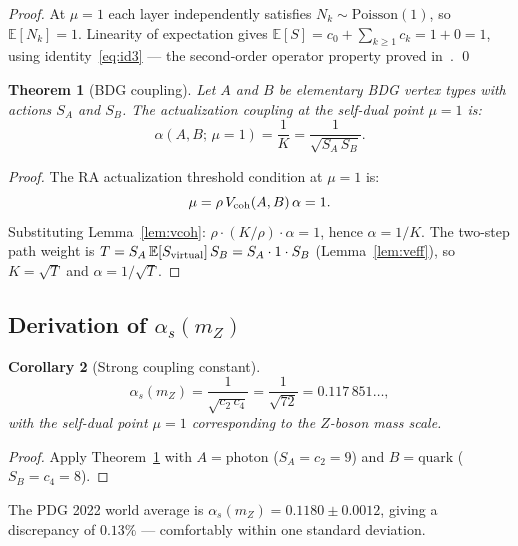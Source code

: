 \documentclass[12pt,a4paper]{article}
\newtheorem{theorem}{Theorem}
\newtheorem{corollary}[theorem]{Corollary}
\theoremstyle{definition}
\begin{document}
\begin{proof}
At $\mu=1$ each layer independently satisfies $N_k \sim \mathrm{Poisson}(1)$,
so $\mathbb{E}[N_k]=1$.  Linearity of expectation gives
$\mathbb{E}[S] = c_0 + \sum_{k\ge 1} c_k = 1 + 0 = 1$, using
identity~\eqref{eq:id3} — the second-order operator property proved
in~\cite{Glaser2014}. \qed
\end{proof}

\begin{theorem}[BDG coupling]
\label{thm:alpha}
Let $A$ and $B$ be elementary BDG vertex types with actions $S_A$ and
$S_B$.  The actualization coupling at the self-dual point $\mu=1$ is:
\begin{equation}
  \label{eq:alpha}
  \alpha(A,B;\,\mu=1) = \frac{1}{K} = \frac{1}{\sqrt{S_A\,S_B}}.
\end{equation}
\end{theorem}

\begin{proof}
The RA actualization threshold condition at $\mu=1$ is:
\[
  \mu = \rho\,V_{\rm coh}(A,B)\,\alpha = 1.
\]
Substituting Lemma~\ref{lem:vcoh}: $\rho\cdot(K/\rho)\cdot\alpha = 1$,
hence $\alpha = 1/K$.  The two-step path weight is
$T = S_A\,\mathbb{E}[S_{\rm virtual}]\,S_B = S_A\cdot 1\cdot S_B$
(Lemma~\ref{lem:veff}), so $K=\sqrt{T}$ and $\alpha = 1/\sqrt{T}$.
\end{proof}

\subsection{Derivation of $\alpha_s(m_Z)$}

\begin{corollary}[Strong coupling constant]
\label{cor:alphas}
\begin{equation}
  \label{eq:alphas}
  \alpha_s(m_Z) = \frac{1}{\sqrt{c_2\,c_4}} = \frac{1}{\sqrt{72}}
  = 0.117\,851\ldots,
\end{equation}
with the self-dual point $\mu=1$ corresponding to the $Z$-boson mass
scale.
\end{corollary}

\begin{proof}
Apply Theorem~\ref{thm:alpha} with $A = \text{photon}$ ($S_A = c_2 = 9$)
and $B = \text{quark}$ ($S_B = c_4 = 8$).
\end{proof}

The PDG 2022 world average is $\alpha_s(m_Z) = 0.1180 \pm 0.0012$,
giving a discrepancy of $0.13\%$ — comfortably within one standard
deviation.
\end{document}
